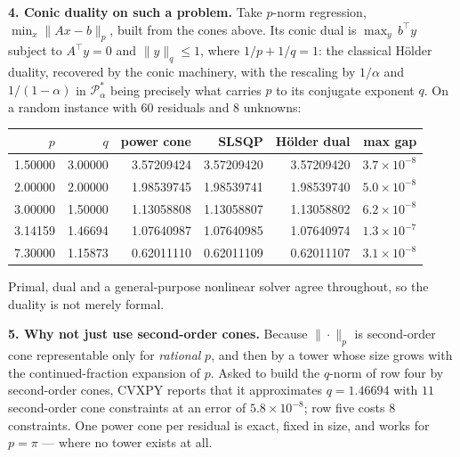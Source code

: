 \documentclass[10pt]{article}
\newcommand{\T}{^{\!\top}}
\begin{document}
\textbf{4. Conic duality on such a problem.}
Take $p$-norm regression, $\min_x \|Ax - b\|_p$, built from the cones
above. Its conic dual is
$\max_y\, b\T y$ subject to $A\T y = 0$ and $\|y\|_q \le 1$, where
$1/p + 1/q = 1$: the classical H\"older duality, recovered by the
conic machinery, with the rescaling by $1/\alpha$ and $1/(1-\alpha)$ in
$\mathcal{P}^*_\alpha$ being precisely what carries $p$ to its
conjugate exponent $q$. On a random instance with $60$ residuals and
$8$ unknowns:

\begin{center}\footnotesize
\setlength{\tabcolsep}{7pt}
\begin{tabular}{@{}rrrrrr@{}}
\toprule
$p$ & $q$ & power cone & SLSQP & H\"older dual & max gap\\
\midrule
1.50000 & 3.00000 & 3.57209424 & 3.57209420 & 3.57209420 & $3.7\times10^{-8}$\\
2.00000 & 2.00000 & 1.98539745 & 1.98539741 & 1.98539740 & $5.0\times10^{-8}$\\
3.00000 & 1.50000 & 1.13058808 & 1.13058807 & 1.13058802 & $6.2\times10^{-8}$\\
3.14159 & 1.46694 & 1.07640987 & 1.07640985 & 1.07640974 & $1.3\times10^{-7}$\\
7.30000 & 1.15873 & 0.62011110 & 0.62011109 & 0.62011107 & $3.1\times10^{-8}$\\
\bottomrule
\end{tabular}
\end{center}

Primal, dual and a general-purpose nonlinear solver agree throughout,
so the duality is not merely formal.

\textbf{5. Why not just use second-order cones.}
Because $\|\cdot\|_p$ is second-order cone representable only for
\emph{rational} $p$, and then by a tower whose size grows with the
continued-fraction expansion of $p$. Asked to build the $q$-norm of row
four by second-order cones, CVXPY reports that it approximates
$q = 1.46694$ with $11$ second-order cone constraints at an error of
$5.8 \times 10^{-8}$; row five costs $8$ constraints. One power cone
per residual is exact, fixed in size, and works for $p = \pi$ --- where
no tower exists at all.
\end{document}
